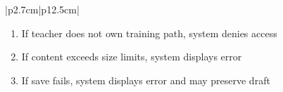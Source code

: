\begin{table}[H]
\begin{tabular}{|p{2.7cm}|p{12.5cm}|}
\begin{minipage}[t]{\linewidth}
                                      \begin{enumerate}[topsep=0pt,itemsep=1pt,parsep=0pt,partopsep=0pt]
                                          \item If teacher does not own training path, system denies access
                                          \item If content exceeds size limits, system displays error
                                          \item If save fails, system displays error and may preserve draft
                                      \end{enumerate}
                                  \end{minipage} \\
        \hline
    \end{tabular}
    \label{tab:teacher-article}
\end{table}
